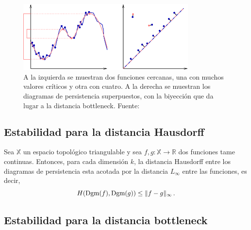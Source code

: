 \begin{figure}[!ht]
\centering
\includegraphics[width=0.8\textwidth]{include/figuras/estabilidadEj.png} 
\caption{A la izquierda se muestran dos funciones cercanas, una con muchos valores críticos y otra con cuatro. A la derecha se muestran los diagramas de persistencia superpuestos, con la biyección que da lugar a la distancia bottleneck. Fuente: \cite{Cohen-Steiner2007}}
\label{ref:ejEstabilidad}
\end{figure}  

\subsection{Estabilidad para la distancia Hausdorff}
\begin{theorem}
Sea $\mathbb{X}$ un espacio topológico triangulable y sea $f,g: \mathbb{X} \to \mathbb{R}$ dos funciones tame continuas. Entonces, para cada dimensión $k$, la distancia Hausdorff entre los diagramas de persistencia esta acotada por la distancia $L_\infty$ entre las funciones, es decir,
\[
H(\text{\rm Dgm}(f), \text{\rm Dgm}(g)) \leq \lVert f-g\rVert_\infty\,.
\]
\end{theorem}
\subsection{Estabilidad para la distancia bottleneck}
